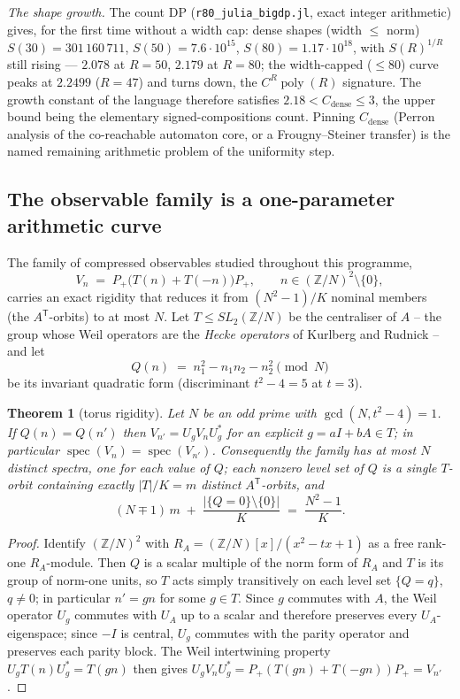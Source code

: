\documentclass[11pt,reqno]{amsart}
\newtheorem{theorem}{Theorem}[section]
\theoremstyle{definition}
\newcommand{\ZZ}{\mathbb{Z}}
\begin{document}
\emph{The shape growth.}  The count DP (\texttt{r80\_julia\_bigdp.jl},
exact integer arithmetic) gives, for the first time without a width cap:
dense shapes (width $\le$ norm) $S(30)=301\,160\,711$, $S(50)=7.6\cdot
10^{15}$, $S(80)=1.17\cdot10^{18}$, with $S(R)^{1/R}$ still rising ---
$2.078$ at $R=50$, $2.179$ at $R=80$; the width-capped ($\le80$) curve
peaks at $2.2499$ ($R=47$) and turns down, the $C^R\operatorname{poly}(R)$
signature.  The growth constant of the language therefore satisfies
$2.18<C_{\mathrm{dense}}\le3$, the upper bound being the elementary
signed-compositions count.  Pinning $C_{\mathrm{dense}}$ (Perron analysis
of the co-reachable automaton core, or a Frougny--Steiner transfer) is the
named remaining arithmetic problem of the uniformity step.


\subsection{The observable family is a one-parameter arithmetic
curve}\label{sub:r82}

The family of compressed observables studied throughout this programme,
\[
  V_n \;=\; P_+\bigl(T(n)+T(-n)\bigr)P_+ ,
  \qquad n\in(\ZZ/N)^2\setminus\{0\},
\]
carries an exact rigidity that reduces it from $(N^2-1)/K$ nominal members
(the $A^{\mathsf T}$-orbits) to at most $N$.  Let $T\le SL_2(\ZZ/N)$ be the
centraliser of $A$ -- the group whose Weil operators are the \emph{Hecke
operators} of Kurlberg and Rudnick \cite{KR2000} -- and let
\[
  Q(n)\;=\;n_1^2-n_1n_2-n_2^2 \pmod N
\]
be its invariant quadratic form (discriminant $t^2-4=5$ at $t=3$).

\begin{theorem}[torus rigidity]\label{thm:torus}
Let $N$ be an odd prime with $\gcd(N,t^2-4)=1$.  If $Q(n)=Q(n')$ then
$V_{n'}=U_gV_nU_g^{*}$ for an explicit $g=aI+bA\in T$; in particular
$\operatorname{spec}(V_n)=\operatorname{spec}(V_{n'})$.  Consequently the
family has at most $N$ distinct spectra, one for each value of $Q$; each
nonzero level set of $Q$ is a single $T$-orbit containing exactly $|T|/K=m$
distinct $A^{\mathsf T}$-orbits, and
\[
  (N\mp1)\,m \;+\; \frac{|\{Q=0\}\setminus\{0\}|}{K}\;=\;\frac{N^2-1}{K}.
\]
\end{theorem}

\begin{proof}
Identify $(\ZZ/N)^2$ with $R_A=(\ZZ/N)[x]/(x^2-tx+1)$ as a free rank-one
$R_A$-module.  Then $Q$ is a scalar multiple of the norm form of $R_A$ and $T$
is its group of norm-one units, so $T$ acts simply transitively on each level
set $\{Q=q\}$, $q\neq0$; in particular $n'=gn$ for some $g\in T$.  Since $g$
commutes with $A$, the Weil operator $U_g$ commutes with $U_A$ up to a scalar
and therefore preserves every $U_A$-eigenspace; since $-I$ is central, $U_g$
commutes with the parity operator and preserves each parity block.  The Weil
intertwining property $U_gT(n)U_g^{*}=T(gn)$ then gives
$U_gV_nU_g^{*}=P_+(T(gn)+T(-gn))P_+=V_{n'}$.
\end{proof}
\end{document}
